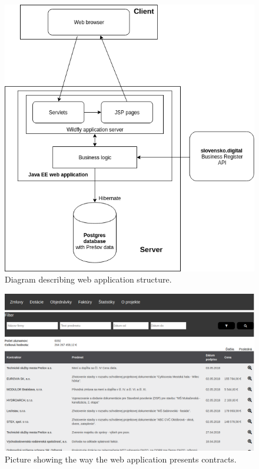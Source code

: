 \documentclass[thesis=B,english]{sprlajur-slovakopendata}[2018/05/12]
\begin{document}
{	\begin{figure}[H]
		\begin{center}
			\includegraphics[scale=0.65]{pictures/webappDiagram.png}
			\caption{Diagram describing web application structure.}
			\label{fig:webapp}
		\end{center}
	\end{figure}
	
	\begin{figure}[H]
		\begin{center}
			\includegraphics[scale=0.30]{pictures/contracts.png}
			\caption{Picture showing the way the web application presents contracts.}
			\label{fig:webapp-contracts}
		\end{center}
	\end{figure}
	
}
\end{document}
